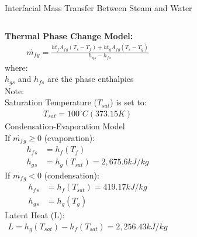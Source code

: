\begin{frame}{Interfacial Mass Transfer Between Steam and Water}
\begin{columns}
\textbf{Thermal Phase Change Model:}
\begin{align*}
    \Dot{m_f{}_g} = \frac{ht_f A_f{}_g (T_s-T_f) + ht_g A_f{}_g (T_s - T_g)}{h_g{}_s - h_f{}_s}
    \end{align*}
    where:\\
    $h_{gs}$ and $h_{fs}$ are the phase enthalpies\\
    Note:\\
    Saturation Temperature ($T_{sat}$) is set to:
    \begin{align*}
        T_{sat} = 100^{\circ}C (373.15K)
    \end{align*}
Condensation-Evaporation Model\cite{prakash1990two}\\
If $\Dot{m_f{}_g}\ge0$ (evaporation):
\begin{align*}
    h_f{}_s &= h_f(T_f)\\
    h_g{}_s &= h_g(T_{sat}) = 2,675.6 kJ/kg
\end{align*}
If $\Dot{m_f{}_g}<0$ (condensation):
\begin{align*}
    h_f{}_s &= h_f(T_{sat}) = 419.17 kJ/kg\\
    h_g{}_s &= h_g(T_{g})
\end{align*}
Latent Heat (L):
\begin{align*}
    L = h_{g}(T_{sat})-h_{f}(T_{sat}) = 2,256.43 kJ/kg
\end{align*}
\end{columns}
\end{frame}

